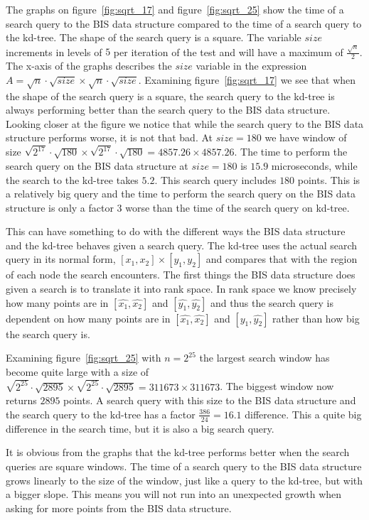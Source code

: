 The graphs on figure~\ref{fig:sqrt_17} and figure~\ref{fig:sqrt_25} show the time of a search query to the BIS data structure compared to the time of a search query to the kd-tree. The shape of the search query is a square. The variable $size$ increments in levels of $5$ per iteration of the test and will have a maximum of $\frac{\sqrt{n}}{2}$. The x-axis of the graphs describes the $size$ variable in the expression $A = \sqrt{n}\cdot\sqrt{size} \times \sqrt{n}\cdot\sqrt{size}$. Examining figure~\ref{fig:sqrt_17} we see that when the shape of the search query is a square, the search query to the kd-tree is always performing better than the search query to the BIS data structure. Looking closer at the figure we notice that while the search query to the BIS data structure performs worse, it is not that bad. At $size = 180$ we have window of size $\sqrt{2^{17}}\cdot\sqrt{180} \times \sqrt{2^{17}}\cdot\sqrt{180} = 4857.26 \times 4857.26$. The time to perform the search query on the BIS data structure at $size = 180$ is $15.9$ microseconds, while the search to the kd-tree takes $5.2$. This search query includes $180$ points. This is a relatively big query and the time to perform the search query on the BIS data structure is only a factor $3$ worse than the time of the search query on kd-tree.


This can have something to do with the different ways the BIS data structure and the kd-tree behaves given a search query. The kd-tree uses the actual search query in its normal form, $[x_1, x_2] \times [y_1, y_2]$ and compares that with the region of each node the search encounters. The first things the BIS data structure does given a search is to translate it into rank space. In rank space we know precisely how many points are in $[\hat{x_1}, \hat{x_2}]$ and $[\hat{y_1}, \hat{y_2}]$ and thus the search query is dependent on how many points are in $[\hat{x_1}, \hat{x_2}]$ and $[\hat{y_1}, \hat{y_2}]$ rather than how big the search query is. 

Examining figure~\ref{fig:sqrt_25} with $n = 2^{25}$ the largest search window has become quite large with a size of $\sqrt{2^{25}}\cdot\sqrt{2895} \times \sqrt{2^{25}}\cdot\sqrt{2895} = 311673 \times 311673$. The biggest window now returns $2895$ points. A search query with this size to the BIS data structure and the search query to the kd-tree has a factor $\frac{386}{24} = 16.1$ difference. This a quite big difference in the search time, but it is also a big search query.

It is obvious from the graphs that the kd-tree performs better when the search queries are square windows. The time of a search query to the BIS data structure grows linearly to the size of the window, just like a query to the kd-tree, but with a bigger slope. This means you will not run into an unexpected growth when asking for more points from the BIS data structure. \\

